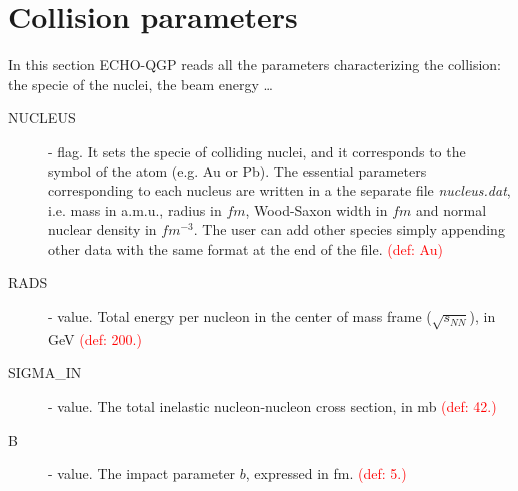 \section{Collision parameters}
In this section ECHO-QGP reads all the parameters characterizing the collision: the specie of the nuclei, the beam energy \dots
\begin{description}
\item[NUCLEUS] \chara - flag. It sets the specie of colliding nuclei, and it corresponds to the symbol of the atom (e.g. Au or Pb). The essential parameters corresponding to each nucleus are written in a the separate file \emph{nucleus.dat}, i.e. mass in a.m.u., radius in $fm$, Wood-Saxon width in $fm$ and normal nuclear density in $fm^{-3}$. The user can add other species simply appending other data with the same format at the end of the file. \textcolor{red}{(def: Au)}
\item[RADS] \real - value. Total energy per nucleon in the center of mass frame ($\sqrt{s_{NN}}$), 
 in GeV \textcolor{red}{(def: 200.)}
\item[SIGMA\_IN] \real - value. The total inelastic nucleon-nucleon cross section, in mb \textcolor{red}{(def: 42.)}
\item[B] \real - value. The impact parameter $b$, expressed in fm. \textcolor{red}{(def: 5.)}
\end{description}

